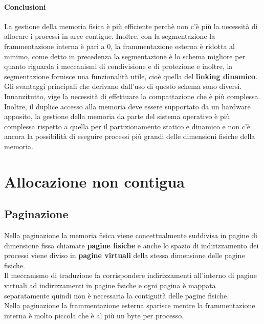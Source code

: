 \documentclass[12pt, letterpaper]{report}
\begin{document}
	\paragraph{Conclusioni}
	La gestione della memoria fisica è più efficiente perchè non c'è più la necessità di allocare i processi in aree contigue. Inoltre, con la segmentazione la frammentazione interna è pari a 0, la frammentazione esterna è ridotta al minimo, come detto in precedenza la segmentazione è lo schema migliore per quanto riguarda i meccanismi di condivisione e di protezione e inoltre, la segmentazione fornisce una funzionalità utile, cioè quella del \textbf{linking dinamico}. \\
	Gli svantaggi principali che derivano dall'uso di questo schema sono diversi. Innanzitutto, vige la necessità di effettuare la compattazione che è più complessa. Inoltre, il duplice accesso alla memoria deve essere supportato da un hardware apposito, la gestione della memoria da parte del sistema operativo è più complessa rispetto a quella per il partizionamento statico e dinamico e non c'è ancora la possibilità di eseguire processi più grandi delle dimensioni fisiche della memoria.
	\section{Allocazione non contigua}
	\subsection{Paginazione}
	Nella paginazione la memoria fisica viene concettualmente suddivisa in pagine di dimensione fissa chiamate \textbf{pagine fisiche} e anche lo spazio di indirizzamento dei processi viene diviso in \textbf{pagine virtuali} della stessa dimensione delle pagine fisiche. \\
	Il meccanismo di traduzione fa corrispondere indirizzamenti all'interno di pagine virtuali ad indirizzamenti in pagine fisiche e ogni pagina è mappata separatamente quindi non è necessaria la contiguità delle pagine fisiche. \\
	Nella paginazione la frammentazione esterna sparisce mentre la frammentazione interna è molto piccola che è al più un byte per processo.
\end{document}
